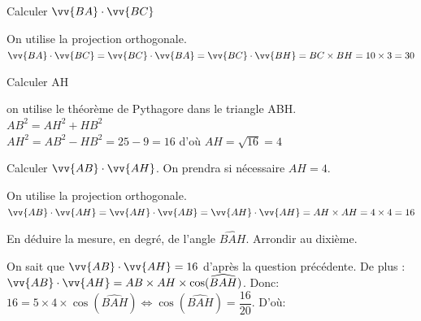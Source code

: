 \documentclass[12pt,a4paper]{article}  %
\begin{document}
\begin{enumMet}
	\item Calculer $\vv{B A} \cdot \vv{B C}$ \quad {}
	\begin{corrBox}
		On utilise la projection orthogonale.\\
		$\vv{B A} \cdot \vv{B C}=\vv{B C} \cdot \vv{B A}=\vv{B C} \cdot \vv{B H}=B C \times B H=10 \times 3=30$
	\end{corrBox}
	\item Calculer AH \quad {}\\
	\begin{corrBox}
		on utilise le théorème de Pythagore dans le triangle ABH.\\
		$A B^{2}=A H^{2}+H B^{2}$\\
		$A H^{2}=A B^{2}-H B^{2}=25-9=16$ d'où $A H=\sqrt{16}=4$
	\end{corrBox}
	\item Calculer $\vv{A B} \cdot \vv{A H}$. On prendra si nécessaire $AH=4$. \quad {}
	\begin{corrBox}
		On utilise la projection orthogonale.\\
		$\vv{AB} \cdot \vv{AH}=\vv{AH} \cdot \vv{AB}=\vv{AH} \cdot \vv{AH}=AH \times AH=4 \times 4=16$
	\end{corrBox}
	\item En déduire la mesure, en degré, de l'angle $\widehat{B A H}$. Arrondir au dixième. \quad {}
	\begin{corrBox}
		On sait que $\vv{AB} \cdot \vv{AH}=16$ d'après la question précédente. De plus :\\
		$\vv{AB} \cdot \vv{AH}=AB\times AH\times \cos(\widehat{BAH})$. Donc:\\
		$16=5\times4\times \cos(\widehat{BAH})\iff  \cos(\widehat{BAH})=\dfrac{16}{20}$. D'où: 
	\end{corrBox}
\end{enumMet}

%
%
\end{document}
